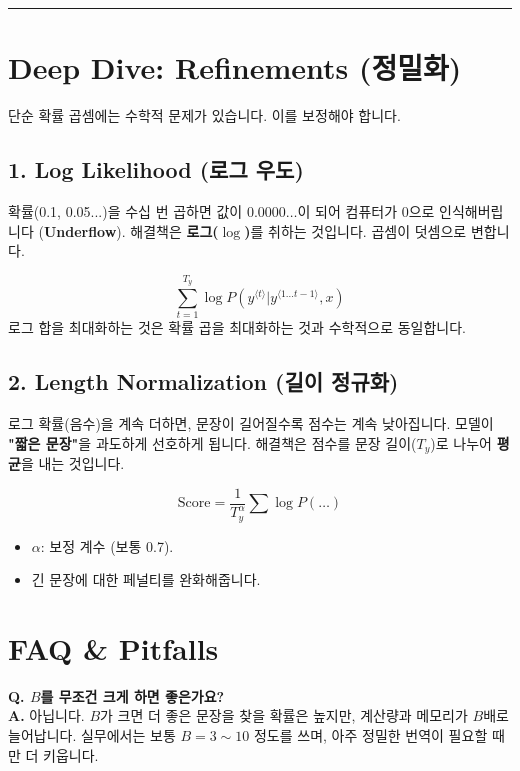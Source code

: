 \documentclass[11pt,a4paper]{book}
\theoremstyle{definition}
\begin{document}
\vspace{0.5cm}\hrule\vspace{0.5cm}

\section{Deep Dive: Refinements (정밀화)}

단순 확률 곱셈에는 수학적 문제가 있습니다. 이를 보정해야 합니다.

\subsection{1. Log Likelihood (로그 우도)}
확률(0.1, 0.05...)을 수십 번 곱하면 값이 $0.0000\dots$이 되어 컴퓨터가 0으로 인식해버립니다 (\textbf{Underflow}).
해결책은 \textbf{로그($\log$)}를 취하는 것입니다. 곱셈이 덧셈으로 변합니다.

\begin{formulabox}[title={Score Function}]
$$ \sum_{t=1}^{T_y} \log P(y^{\langle t \rangle} | y^{\langle 1 \dots t-1 \rangle}, x) $$
로그 합을 최대화하는 것은 확률 곱을 최대화하는 것과 수학적으로 동일합니다.
\end{formulabox}

\subsection{2. Length Normalization (길이 정규화)}
로그 확률(음수)을 계속 더하면, 문장이 길어질수록 점수는 계속 낮아집니다. 모델이 \textbf{"짧은 문장"}을 과도하게 선호하게 됩니다.
해결책은 점수를 문장 길이($T_y$)로 나누어 \textbf{평균}을 내는 것입니다.

\begin{formulabox}[title={Normalized Score}]
$$ \text{Score} = \frac{1}{T_y^\alpha} \sum \log P(\dots) $$
\begin{itemize}
    \item $\alpha$: 보정 계수 (보통 0.7).
    \item 긴 문장에 대한 페널티를 완화해줍니다.
\end{itemize}
\end{formulabox}

\section{FAQ \& Pitfalls}

\textbf{Q. $B$를 무조건 크게 하면 좋은가요?} \\
\textbf{A.} 아닙니다. $B$가 크면 더 좋은 문장을 찾을 확률은 높지만, 계산량과 메모리가 $B$배로 늘어납니다. 실무에서는 보통 $B=3 \sim 10$ 정도를 쓰며, 아주 정밀한 번역이 필요할 때만 더 키웁니다.
\end{document}
